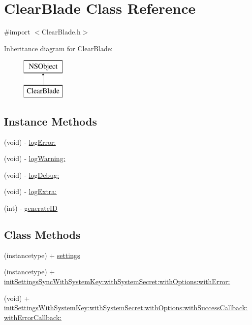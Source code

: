 \hypertarget{interface_clear_blade}{\section{Clear\+Blade Class Reference}
\label{interface_clear_blade}
}


{\ttfamily \#import $<$Clear\+Blade.\+h$>$}

Inheritance diagram for Clear\+Blade\+:\begin{figure}[H]
\begin{center}
\leavevmode
\includegraphics[height=2.000000cm]{interface_clear_blade}
\end{center}
\end{figure}
\subsection*{Instance Methods}
\begin{DoxyCompactItemize}
\item 
(void) -\/ \hyperlink{interface_clear_blade_a4a2da5ca59acd23e44d0f793e9eb778b}{log\+Error\+:}
\item 
(void) -\/ \hyperlink{interface_clear_blade_aa1d4699543bf38e300b5b0ad256c44c2}{log\+Warning\+:}
\item 
(void) -\/ \hyperlink{interface_clear_blade_ada4ef00171405d7247b1d07d3a3e70f6}{log\+Debug\+:}
\item 
(void) -\/ \hyperlink{interface_clear_blade_a03f35439a4d2b9908872cfdfbd50a0b5}{log\+Extra\+:}
\item 
(int) -\/ \hyperlink{interface_clear_blade_acdf4d6feb5a40c60be3b4ed0846d52e5}{generate\+I\+D}
\end{DoxyCompactItemize}
\subsection*{Class Methods}
\begin{DoxyCompactItemize}
\item 
(instancetype) + \hyperlink{interface_clear_blade_accced1239f531de87d166d617a021673}{settings}
\item 
(instancetype) + \hyperlink{interface_clear_blade_a234fefa317e73d46768506a34a89e5fa}{init\+Settings\+Sync\+With\+System\+Key\+:with\+System\+Secret\+:with\+Options\+:with\+Error\+:}
\item 
(void) + \hyperlink{interface_clear_blade_a76b3d3e815239c17dba4f858e774bcab}{init\+Settings\+With\+System\+Key\+:with\+System\+Secret\+:with\+Options\+:with\+Success\+Callback\+:with\+Error\+Callback\+:}
\end{DoxyCompactItemize}
